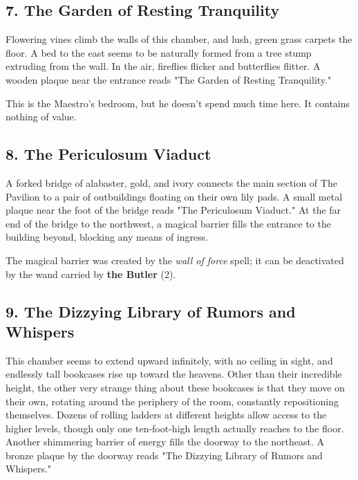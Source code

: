 \documentclass[10pt,a4paper,twoside,bg=print,twocolumn,openany,nodeprecatedcode]{dndbook}
\begin{document}
\subsection{7. The Garden of Resting Tranquility}
\begin{DndReadAloud}{}
Flowering vines climb the walls of this chamber, and lush, green grass carpets the floor. A bed to the east seems to be naturally formed from a tree stump extruding from the wall. In the air, fireflies flicker and butterflies flitter. A wooden plaque near the entrance reads "The Garden of Resting Tranquility."

\end{DndReadAloud}

This is the Maestro's bedroom, but he doesn't spend much time here. It contains nothing of value.

\subsection{8. The Periculosum Viaduct}
\begin{DndReadAloud}{}
A forked bridge of alabaster, gold, and ivory connects the main section of The Pavilion to a pair of outbuildings floating on their own lily pads. A small metal plaque near the foot of the bridge reads "The Periculosum Viaduct." At the far end of the bridge to the northwest, a magical barrier fills the entrance to the building beyond, blocking any means of ingress.

\end{DndReadAloud}

The magical barrier was created by the \textit{wall of force} spell; it can be deactivated by the wand carried by \textbf{the Butler} (2).

\subsection{9. The Dizzying Library of Rumors and Whispers}
\begin{DndReadAloud}{}
This chamber seems to extend upward infinitely, with no ceiling in sight, and endlessly tall bookcases rise up toward the heavens. Other than their incredible height, the other very strange thing about these bookcases is that they move on their own, rotating around the periphery of the room, constantly repositioning themselves. Dozens of rolling ladders at different heights allow access to the higher levels, though only one ten-foot-high length actually reaches to the floor. Another shimmering barrier of energy fills the doorway to the northeast. A bronze plaque by the doorway reads "The Dizzying Library of Rumors and Whispers."

\end{DndReadAloud}
\end{document}
